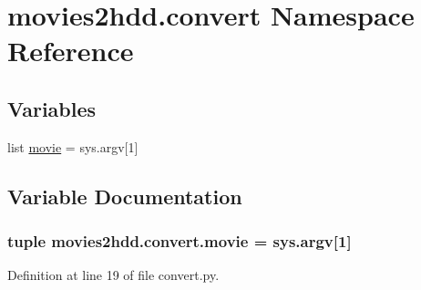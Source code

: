 \hypertarget{namespacemovies2hdd_1_1convert}{\section{movies2hdd.\-convert Namespace Reference}
\label{namespacemovies2hdd_1_1convert}
}
\subsection*{Variables}
\begin{DoxyCompactItemize}
\item 
list \hyperlink{namespacemovies2hdd_1_1convert_aa56ab068434359bf27101c2903a2a076}{movie} = sys.\-argv\mbox{[}1\mbox{]}
\end{DoxyCompactItemize}


\subsection{Variable Documentation}
\hypertarget{namespacemovies2hdd_1_1convert_aa56ab068434359bf27101c2903a2a076}{
\subsubsection[{movie}]{\setlength{\rightskip}{0pt plus 5cm}tuple movies2hdd.\-convert.\-movie = sys.\-argv\mbox{[}1\mbox{]}}}\label{namespacemovies2hdd_1_1convert_aa56ab068434359bf27101c2903a2a076}


Definition at line 19 of file convert.\-py.

